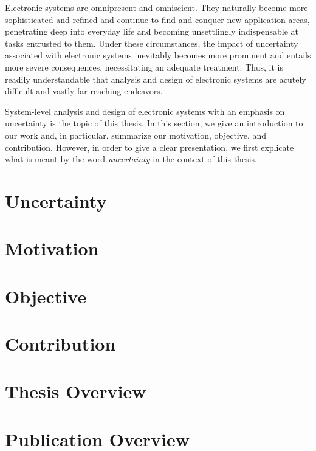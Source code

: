 Electronic systems are omnipresent and omniscient. They naturally become more
sophisticated and refined and continue to find and conquer new application
areas, penetrating deep into everyday life and becoming unsettlingly
indispensable at tasks entrusted to them. Under these circumstances, the impact
of uncertainty associated with electronic systems inevitably becomes more
prominent and entails more severe consequences, necessitating an adequate
treatment. Thus, it is readily understandable that analysis and design of
electronic systems are acutely difficult and vastly far-reaching endeavors.

System-level analysis and design of electronic systems with an emphasis on
uncertainty is the topic of this thesis. In this section, we give an
introduction to our work and, in particular, summarize our motivation,
objective, and contribution. However, in order to give a clear presentation, we
first explicate what is meant by the word \emph{uncertainty} in the context of
this thesis.

\section{Uncertainty}

\section{Motivation}

\section{Objective}

\section{Contribution}

\section{\pasttitle}

\section{Thesis Overview}

\section{Publication Overview}
